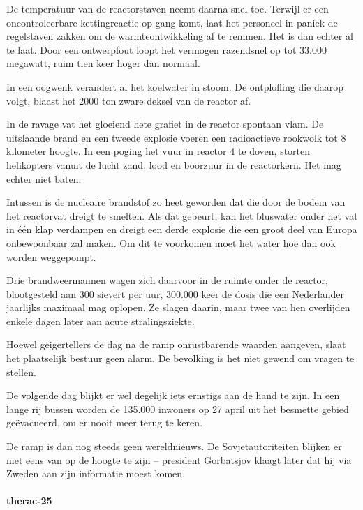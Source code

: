 De temperatuur van de reactorstaven neemt daarna snel toe. Terwijl er een oncontroleerbare kettingreactie op gang komt, laat het personeel in paniek de regelstaven zakken om de warmteontwikkeling af te remmen. Het is dan echter al te laat. Door een ontwerpfout loopt het vermogen razendsnel op tot 33.000 megawatt, ruim tien keer hoger dan normaal.

In een oogwenk verandert al het koelwater in stoom. De ontploffing die daarop volgt, blaast het 2000 ton zware deksel van de reactor af.

In de ravage vat het gloeiend hete grafiet in de reactor spontaan vlam. De uitslaande brand en een tweede explosie voeren een radioactieve rookwolk tot 8 kilometer hoogte. 
In een poging het vuur in reactor 4 te doven, storten helikopters vanuit de lucht zand, lood en boorzuur in de reactorkern. Het mag echter niet baten.

Intussen is de nucleaire brandstof zo heet geworden dat die door de bodem van het reactorvat dreigt te smelten. Als dat gebeurt, kan het bluswater onder het vat in één klap verdampen en dreigt een derde explosie die een groot deel van Europa onbewoonbaar zal maken. Om dit te voorkomen moet het water hoe dan ook worden weggepompt.

Drie brandweermannen wagen zich daarvoor in de ruimte onder de reactor, blootgesteld aan 300 sievert per uur, 300.000 keer de dosis die een Nederlander jaarlijks maximaal mag oplopen. Ze slagen daarin, maar twee van hen overlijden enkele dagen later aan acute stralingsziekte.

Hoewel geigertellers de dag na de ramp onrustbarende waarden aangeven, slaat het plaatselijk bestuur geen alarm. De bevolking is het niet gewend om vragen te stellen.

De volgende dag blijkt er wel degelijk iets ernstigs aan de hand te zijn. In een lange rij bussen worden de 135.000 inwoners op 27 april uit het besmette gebied geëvacueerd, om er nooit meer terug te keren.

De ramp is dan nog steeds geen wereldnieuws. De Sovjetautoriteiten blijken er niet eens van op de hoogte te zijn – president Gorbatsjov klaagt later dat hij via Zweden aan zijn informatie moest komen.
\cite{verschuur14012013tjernobylreports}
\cite{paperlessarchivesTjernobyl}
\cite{vargos082000tjernobylconcerns}
\cite{mauroNuclearRiskSociety}
\cite{vienna06092005LookingBack}

\paragraph{therac-25}

